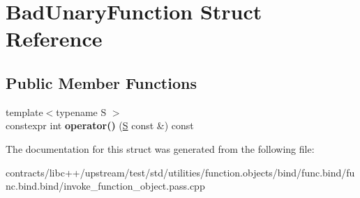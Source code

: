 \hypertarget{struct_bad_unary_function}{}\section{Bad\+Unary\+Function Struct Reference}
\label{struct_bad_unary_function}
\subsection*{Public Member Functions}
\begin{DoxyCompactItemize}
\item 
\mbox{\label{struct_bad_unary_function_a45be66dd060ed3fcbc0cbaa0a9c25f4b}} 
{\footnotesize template$<$typename S $>$ }\\constexpr int {\bfseries operator()} (\mbox{\hyperlink{struct_s}{S}} const \&) const
\end{DoxyCompactItemize}


The documentation for this struct was generated from the following file\+:\begin{DoxyCompactItemize}
\item 
contracts/libc++/upstream/test/std/utilities/function.\+objects/bind/func.\+bind/func.\+bind.\+bind/invoke\+\_\+function\+\_\+object.\+pass.\+cpp\end{DoxyCompactItemize}
